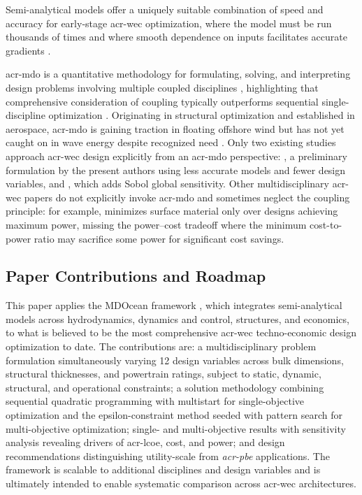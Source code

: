     Semi-analytical models offer a uniquely suitable combination of speed and accuracy for early-stage \gls{acr-wec} optimization, where the model must be run thousands of times and where smooth dependence on inputs facilitates accurate gradients \citep{mccabe_development_2026}.
    
    
\else
    \gls{acr-mdo} is a quantitative methodology for formulating, solving, and interpreting design problems involving multiple coupled disciplines \citep{agte_mdo_2010}, highlighting that comprehensive consideration of coupling typically outperforms sequential single-discipline optimization \citep{martins_multidisciplinary_2013}.
    Originating in structural optimization and established in aerospace, \gls{acr-mdo} is gaining traction in floating offshore wind \citep{abbas_control_2024,jasa_effectively_2022,patryniak_multidisciplinary_2022} but has not yet caught on in wave energy despite recognized need \citep{mi_multi-scale_2025,ringwood_empowering_2023}.
    Only two existing studies approach \gls{acr-wec} design explicitly from an \gls{acr-mdo} perspective: \citet{mccabe_multidisciplinary_2022}, a preliminary formulation by the present authors using less accurate models and fewer design variables, and \citet{khanal_multi-objective_2024}, which adds Sobol global sensitivity.
    Other multidisciplinary \gls{acr-wec} papers do not explicitly invoke \gls{acr-mdo} and sometimes neglect the coupling principle: for example, \citet{edwards_optimisation_2022} minimizes surface material only over designs achieving maximum power, missing the power--cost tradeoff where the minimum cost-to-power ratio may sacrifice some power for significant cost savings.

    
\fi

\subsection{Paper Contributions and Roadmap}
\ifdefined\DISSERTATION
    This paper applies the MDOcean framework \citep{mccabe_development_2026}, which integrates semi-analytical models across hydrodynamics, dynamics and control, structures, and economics, to what is believed to be the most comprehensive \gls{acr-wec} techno-economic design optimization to date.
    The contributions are: a multidisciplinary problem formulation simultaneously varying 12 design variables across bulk dimensions, structural thicknesses, and powertrain ratings, subject to static, dynamic, structural, and operational constraints;
    a solution methodology combining sequential quadratic programming with multistart for single-objective optimization and the epsilon-constraint method seeded with pattern search for multi-objective optimization;
    single- and multi-objective results with sensitivity analysis revealing drivers of \gls{acr-lcoe}, cost, and power;
    and design recommendations distinguishing utility-scale from \emph{\gls{acr-pbe}} applications.
    The framework is scalable to additional disciplines and design variables and is ultimately intended to enable systematic comparison across \gls{acr-wec} architectures.

